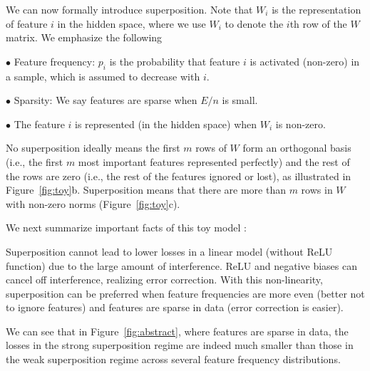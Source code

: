 \documentclass{article}
\begin{document}
We can now formally introduce superposition. Note that $W_i$ is the representation of feature $i$ in the hidden space, where we use $W_i$ to denote the $i$th row of the $W$ matrix. We emphasize the following
\begin{tcolorbox}[colframe=mitred, opacityback=0.9, title=Key concepts]
$\bullet$ Feature frequency: $p_i$ is the probability that feature $i$ is activated (non-zero) in a sample, which is assumed to decrease with $i$. 

$\bullet$ Sparsity: We say features are sparse when $E / n$ is small.

$\bullet$ The feature $i$ is represented (in the hidden space) when $W_i$ is non-zero.
\end{tcolorbox}
No superposition ideally means the first $m$ rows of $W$ form an orthogonal basis (i.e., the first $m$ most important features represented perfectly) and the rest of the rows are zero (i.e., the rest of the features ignored or lost), as illustrated in Figure~\ref{fig:toy}b. Superposition means that there are more than $m$ rows in $W$ with non-zero norms (Figure~\ref{fig:toy}c).

We next summarize important facts of this toy model \cite{elhage2022superposition}:
\begin{tcolorbox}[colframe=mitred, opacityback=0.9, title=Preliminaries]
Superposition cannot lead to lower losses in a linear model (without ReLU function) due to the large amount of interference. ReLU and negative biases can cancel off interference, realizing error correction. With this non-linearity, superposition can be preferred when feature frequencies are more even (better not to ignore features) and features are sparse in data (error correction is easier).
\end{tcolorbox}
We can see that in Figure~\ref{fig:abstract}, where features are sparse in data, the losses in the strong superposition regime are indeed much smaller than those in the weak superposition regime across several feature frequency distributions. 
\end{document}
